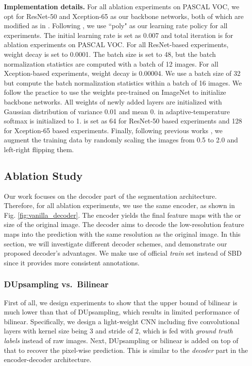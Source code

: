 \documentclass[10pt,twocolumn,letterpaper]{article}
\newcommand{\1}{{\mathbbm{1}}}
\begin{document}
\textbf{Implementation details.} For all ablation experiments on PASCAL VOC, we opt for ResNet-50 \cite{he2016deep} and Xception-65 \cite{chollet2017xception} as our backbone networks, both of which are modified as in \cite{chen2018encoder}. Following \cite{liu2015parsenet, chen2017rethinking, chen2018encoder}, we use ``poly" as our learning rate policy for all experiments. The initial learning rate is set as 0.007 and total iteration is  for ablation experiments on PASCAL VOC. For all ResNet-based experiments, weight decay is set to 0.0001. The batch size is set to 48, but the batch normalization \cite{ioffe2015batch} statistics are computed with a batch of 12 images. For all Xception-based experiments, weight decay is 0.00004.
We use a batch size of 32 but compute the batch normalization statistics within a batch of 16 images. We follow the  practice \cite{chen2018encoder, chen2017rethinking, zhang2019deep} to use the weights pre-trained on ImageNet \cite{deng2009imagenet} to initialize backbone networks. All weights of newly added layers are initialized with Gaussian distribution of variance 0.01 and mean 0.  in adaptive-temperature softmax is initialized to 1.  is set as 64 for ResNet-50 based experiments and 128 for Xception-65 based experiments. Finally, following previous works \cite{chen2017rethinking, chen2018deeplab, chen2018encoder}, we augment the training data by randomly scaling the images from 0.5 to 2.0 and left-right flipping them.

\subsection{Ablation Study}
Our work focuses on the decoder part of the segmentation architecture. Therefore, for all ablation experiments, we use the same encoder, as shown in Fig. \ref{fig:vanilla_decoder}. The encoder yields the final feature maps with the  or  size of the original image. The decoder aims to decode the low-resolution feature maps into the prediction with the same resolution as the original image. In this section, we will investigate different decoder schemes, and demonstrate our proposed decoder's advantages. We make use of official {\it train} set instead of SBD \cite{hariharan2011semantic} since it provides more consistent annotations.

\subsubsection{DUpsampling vs.\  Bilinear} \label{section:dupsampling_vs_bilinear}
First of all, we design experiments to show that the upper bound of bilinear is much lower than that of DUpsampling, which results in limited performance of bilinear. Specifically, we design a light-weight CNN including five convolutional layers with kernel size being 3 and stride of 2, which is fed  with {\em ground truth labels} instead of raw images. Next, DUpsampling or bilinear is added on top of that to recover the pixel-wise prediction.
This is similar to the {\em decoder} part in the encoder-decoder architecture.
\end{document}
